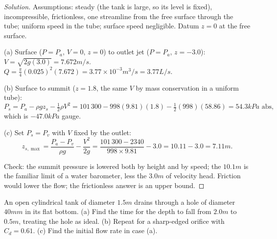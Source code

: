 \begin{proof}[Solution]
Assumptions: steady (the tank is large, so its level is fixed), incompressible, frictionless, one streamline from the free surface through the tube; uniform speed in the tube; surface speed negligible. Datum $z = 0$ at the free surface.

(a) Surface ($P = P_a$, $V = 0$, $z = 0$) to outlet jet ($P = P_a$, $z = -3.0$): $V = \sqrt{2g(3.0)} = 7.672\unit{m/s}$. $Q = \tfrac{\pi}{4}(0.025)^2(7.672) = 3.77\times10^{-3}\unit{m^3/s} = 3.77\unit{L/s}$.

(b) Surface to summit ($z = 1.8$, the same $V$ by mass conservation in a uniform tube):
\[
P_s = P_a - \rho gz_s - \tfrac12\rho V^2 = 101\,300 - 998(9.81)(1.8) - \tfrac12(998)(58.86) = 54.3\unit{kPa}\text{ abs},
\]
which is $-47.0\unit{kPa}$ gauge.

(c) Set $P_s = P_v$ with $V$ fixed by the outlet:
\[
z_{s,\max} = \frac{P_a - P_v}{\rho g} - \frac{V^2}{2g} = \frac{101\,300 - 2340}{998\times9.81} - 3.0 = 10.11 - 3.0 = 7.11\unit{m}.
\]

Check: the summit pressure is lowered both by height and by speed; the $10.1\unit{m}$ is the familiar limit of a water barometer, less the $3.0\unit{m}$ of velocity head. Friction would lower the flow; the frictionless answer is an upper bound.
\end{proof}

\begin{example}
An open cylindrical tank of diameter $1.5\unit{m}$ drains through a hole of diameter $40\unit{mm}$ in its flat bottom. (a) Find the time for the depth to fall from $2.0\unit{m}$ to $0.5\unit{m}$, treating the hole as ideal. (b) Repeat for a sharp-edged orifice with $C_d = 0.61$. (c) Find the initial flow rate in case (a).
\end{example}

